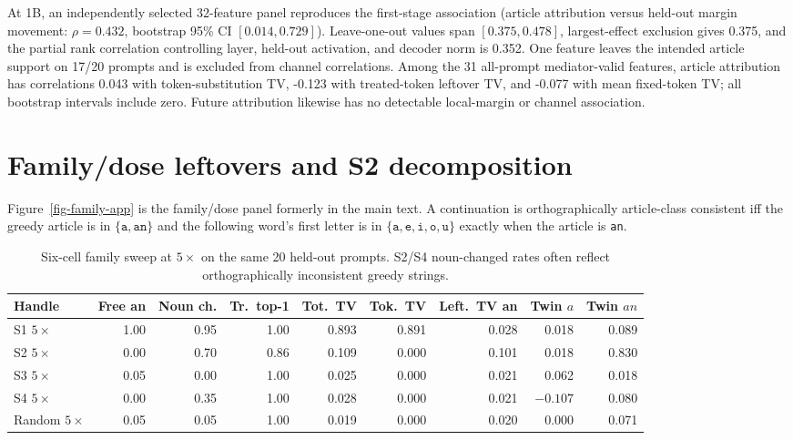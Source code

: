 At 1B, an independently selected 32-feature panel reproduces the first-stage
association (article attribution versus held-out margin movement:
\(\rho=0.432\), bootstrap 95\% CI \([0.014,0.729]\)). Leave-one-out values span
\([0.375,0.478]\), largest-effect exclusion gives 0.375, and the partial rank
correlation controlling layer, held-out activation, and decoder norm is 0.352.
One feature leaves the intended article support on 17/20 prompts and is excluded
from channel correlations. Among the 31 all-prompt mediator-valid features,
article attribution has correlations 0.043 with token-substitution TV, -0.123
with treated-token leftover TV, and -0.077 with mean fixed-token TV; all
bootstrap intervals include zero. Future attribution likewise has no detectable
local-margin or channel association.

\section{Family/dose leftovers and S2 decomposition}
\label{app:s2-decomp}

Figure~\ref{fig-family-app} is the family/dose panel formerly in the main
text. A continuation is orthographically article-class consistent iff the greedy article is in
\(\{\texttt{a},\texttt{an}\}\) and the following word's first letter is in
\(\{\texttt{a},\texttt{e},\texttt{i},\texttt{o},\texttt{u}\}\) exactly when
the article is \texttt{an}.

\begin{table}[h]
\centering
\caption{Six-cell family sweep at \(5\times\) on the same 20 held-out
prompts. S2/S4 noun-changed rates often reflect orthographically inconsistent greedy strings.}
\label{tbl-family}
\scriptsize
\begin{tabular}{lrrrrrrrr}
\toprule
Handle & Free an & Noun ch. & Tr.\ top-1 & Tot.\ TV & Tok.\ TV & Left.\ TV an & Twin \(a\) & Twin \(an\) \\
\midrule
S1 \(5\times\) & 1.00 & 0.95 & 1.00 & 0.893 & 0.891 & 0.028 & 0.018 & 0.089 \\
S2 \(5\times\) & 0.00 & 0.70 & 0.86 & 0.109 & 0.000 & 0.101 & 0.018 & 0.830 \\
S3 \(5\times\) & 0.05 & 0.00 & 1.00 & 0.025 & 0.000 & 0.021 & 0.062 & 0.018 \\
S4 \(5\times\) & 0.00 & 0.35 & 1.00 & 0.028 & 0.000 & 0.021 & \(-0.107\) & 0.080 \\
Random \(5\times\) & 0.05 & 0.05 & 1.00 & 0.019 & 0.000 & 0.020 & 0.000 & 0.071 \\
\bottomrule
\end{tabular}
\end{table}

